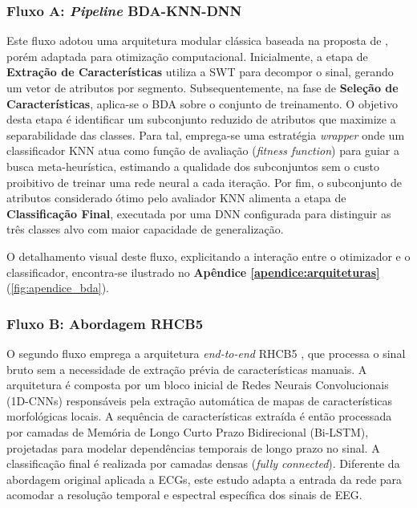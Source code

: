 \documentclass[alpha-refs,brazilian]{CC-EC_TF-TC}
\begin{document}
\subsubsection{Fluxo A: \textit{Pipeline} BDA-KNN-DNN}

Este fluxo adotou uma arquitetura modular clássica baseada na proposta de \cite{Yogarajan2023}, porém adaptada para otimização computacional. Inicialmente, a etapa de \textbf{Extração de Características} utiliza a SWT para decompor o sinal, gerando um vetor de atributos por segmento. Subsequentemente, na fase de \textbf{Seleção de Características}, aplica-se o BDA sobre o conjunto de treinamento. O objetivo desta etapa é identificar um subconjunto reduzido de atributos que maximize a separabilidade das classes. Para tal, emprega-se uma estratégia \textit{wrapper} onde um classificador KNN atua como função de avaliação (\textit{fitness function}) para guiar a busca meta-heurística, estimando a qualidade dos subconjuntos sem o custo proibitivo de treinar uma rede neural a cada iteração. Por fim, o subconjunto de atributos considerado ótimo pelo avaliador KNN alimenta a etapa de \textbf{Classificação Final}, executada por uma DNN configurada para distinguir as três classes alvo com maior capacidade de generalização.

O detalhamento visual deste fluxo, explicitando a interação entre o otimizador e o classificador, encontra-se ilustrado no \textbf{Apêndice \ref{apendice:arquiteturas}} (\autoref{fig:apendice_bda}).

\subsubsection{Fluxo B: Abordagem RHCB5}

O segundo fluxo emprega a arquitetura \textit{end-to-end} RHCB5 \citep{Maggioni2024}, que processa o sinal bruto sem a necessidade de extração prévia de características manuais. A arquitetura é composta por um bloco inicial de Redes Neurais Convolucionais (1D-CNNs) responsáveis pela extração automática de mapas de características morfológicas locais. A sequência de características extraída é então processada por camadas de Memória de Longo Curto Prazo Bidirecional (Bi-LSTM), projetadas para modelar dependências temporais de longo prazo no sinal. A classificação final é realizada por camadas densas (\textit{fully connected}). Diferente da abordagem original aplicada a ECGs, este estudo adapta a entrada da rede para acomodar a resolução temporal e espectral específica dos sinais de EEG.
\end{document}
